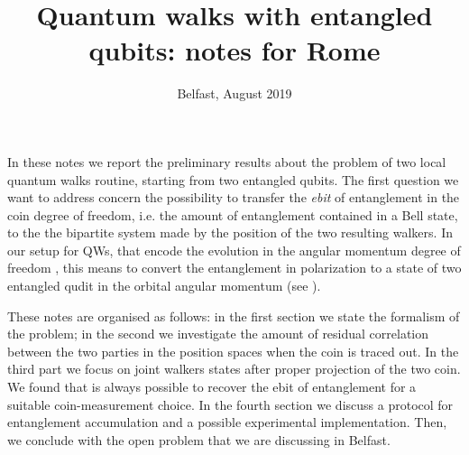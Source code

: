 \documentclass[
	aps, pra, authorblock, superscriptaddress, twocolumn,
	10pt
]{revtex4-1}
\begin{document}
\title{Quantum walks with entangled qubits: notes for Rome} 
\author{Belfast, August 2019}
\maketitle

In these notes we report the preliminary results about the problem of two 
local quantum walks routine, starting from two entangled qubits. The first question we want to address concern the possibility to transfer the \emph{ebit} of entanglement in the coin degree of freedom, i.e. the amount of entanglement contained in a Bell state, to the the bipartite system made by the position of the two resulting walkers. In our setup for QWs, that encode the evolution in the angular momentum degree of freedom \cite{giordani_2018}, this means to convert the entanglement in polarization to a state of two entangled qudit in the orbital angular momentum (see ).

These notes are organised as follows: in the first section we state the formalism of the problem; in the second we investigate the amount of residual correlation between the two parties in the position spaces when the coin is traced out. In the third part we focus on joint walkers states after proper projection of the two coin. We found that is always possible to recover the ebit of entanglement for a suitable coin-measurement choice. In the fourth section we discuss a protocol for entanglement accumulation and a possible experimental implementation. Then, we conclude with the open problem that we are discussing in Belfast.
\end{document}
